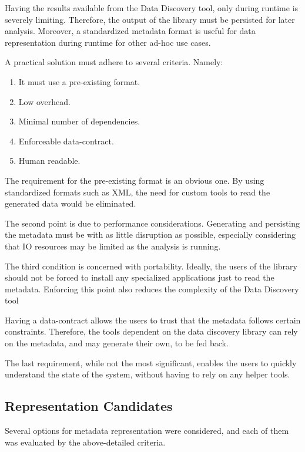 Having the results available from the Data Discovery tool, only during runtime is severely limiting.
Therefore, the output of the library must be persisted for later analysis.
Moreover, a standardized
metadata format is useful for data representation during runtime for other ad-hoc use cases.
\newline

A practical solution must adhere to several criteria.
Namely:
\begin{enumerate}
    \item It must use a pre-existing format.
    \item Low overhead.
    \item Minimal number of dependencies.
    \item Enforceable data-contract.
    \item Human readable.
\end{enumerate}

The requirement for the pre-existing format is an obvious one.
By using standardized formats such as XML, the need for custom tools to read the generated data would be
eliminated.

The second point is due to performance considerations.
Generating and persisting the metadata must be
with as little disruption as possible, especially considering that IO resources may be limited as the
analysis is running.

The third condition is concerned with portability.
Ideally, the users of the library should not be
forced to install any specialized applications just to read the metadata.
Enforcing this point also reduces the complexity of the Data Discovery tool

Having a data-contract allows the users to trust that the metadata follows certain constraints.
Therefore, the tools dependent on the data discovery library can rely on the metadata, and may generate their own,
to be fed back.

The last requirement, while not the most significant, enables the users to quickly understand the
state of the system, without having to rely on any helper tools.

\subsection{Representation Candidates}

Several options for metadata representation were considered, and each of them was evaluated by the above-detailed criteria.

